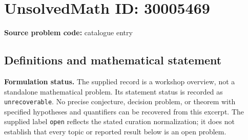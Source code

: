 \documentclass[11pt]{article}
\begin{document}
\section*{UnsolvedMath ID: 30005469}
\textbf{Source problem code:} catalogue entry
\subsection{Definitions and mathematical statement}
\textbf{Formulation status.} The supplied record is a workshop overview, not a standalone mathematical problem. Its statement status is recorded as \texttt{unrecoverable}. No precise conjecture, decision problem, or theorem with specified hypotheses and quantifiers can be recovered from this excerpt. The supplied label \texttt{open} reflects the stated curation normalization; it does not establish that every topic or reported result below is an open problem.
\end{document}
